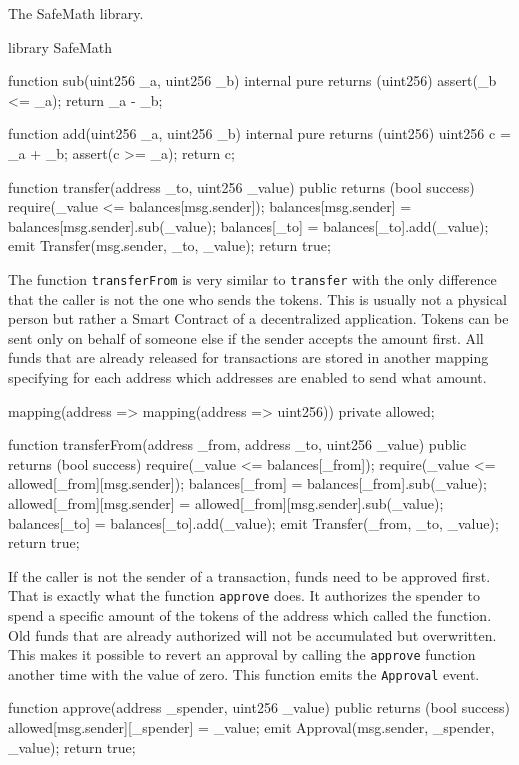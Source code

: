 \begin{program}
\caption{The SafeMath library.}
\label{prog:SafeMath}
\begin{GenericCode}
library SafeMath {
  function sub(uint256 _a, uint256 _b) internal pure returns (uint256) {
    assert(_b <= _a);
    return _a - _b;
  }

  function add(uint256 _a, uint256 _b) internal pure returns (uint256) {
    uint256 c = _a + _b;
    assert(c >= _a);
    return c;
  }
}
\end{GenericCode}
\end{program}

\begin{GenericCode}
function transfer(address _to, uint256 _value) public returns (bool success) {
  require(_value <= balances[msg.sender]);
  balances[msg.sender] = balances[msg.sender].sub(_value);
  balances[_to] = balances[_to].add(_value);
  emit Transfer(msg.sender, _to, _value);
  return true;
}
\end{GenericCode}

The function \texttt{transferFrom} is very similar to \texttt{transfer} with the only difference that the caller is not the one who sends the tokens. This is usually not a physical person but rather a Smart Contract of a decentralized application. Tokens can be sent only on behalf of someone else if the sender accepts the amount first. All funds that are already released for transactions are stored in another mapping specifying for each address which addresses are enabled to send what amount.

\begin{GenericCode}
mapping(address => mapping(address => uint256)) private allowed;

function transferFrom(address _from, address _to, uint256 _value) public returns (bool success) {
  require(_value <= balances[_from]);
  require(_value <= allowed[_from][msg.sender]);
  balances[_from] = balances[_from].sub(_value);
  allowed[_from][msg.sender] = allowed[_from][msg.sender].sub(_value);
  balances[_to] = balances[_to].add(_value);
  emit Transfer(_from, _to, _value);
  return true;
}
\end{GenericCode}

If the caller is not the sender of a transaction, funds need to be approved first. That is exactly what the function \texttt{approve} does. It authorizes the spender to spend a specific amount of the tokens of the address which called the function. Old funds that are already authorized will not be accumulated but overwritten. This makes it possible to revert an approval by calling the \texttt{approve} function another time with the value of zero. This function emits the \texttt{Approval} event.
\begin{GenericCode}
function approve(address _spender, uint256 _value) public returns (bool success) {
  allowed[msg.sender][_spender] = _value;
  emit Approval(msg.sender, _spender, _value);
  return true;
}
\end{GenericCode}

